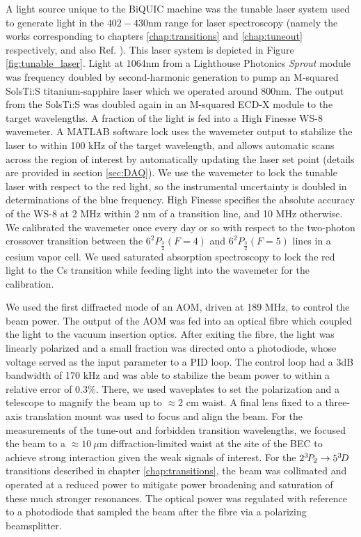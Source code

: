 	A light source unique to the BiQUIC machine was the tunable laser system used to generate light in the $402-430$nm range for laser spectroscopy (namely the works \cite{Ross20,Henson22} corresponding to chapters \ref{chap:transitions} and \ref{chap:tuneout} respectively, and also Ref. \cite{Thomas20}).
	This laser system is depicted in Figure \ref{fig:tunable_laser}.
	Light at 1064nm from a Lighthouse Photonics \emph{Sprout} module was frequency doubled by second-harmonic generation to pump an M-squared SolsTi:S titanium-sapphire laser which we operated around 800nm.
	The output from the SolsTi:S was doubled again in an M-squared ECD-X module to the target wavelengths.
	A fraction of the light is fed into a High Finesse WS-8 wavemeter.
	A MATLAB software lock uses the wavemeter output to stabilize the laser to within 100 kHz of the target wavelength, and allows automatic scans across the region of interest by automatically updating the laser set point (details are provided in section \ref{sec:DAQ}).
	We use the wavemeter to lock the tunable laser with respect to the red light, so the instrumental uncertainty is doubled in determinations of the blue frequency.
	High Finesse specifies the absolute accuracy of the WS-8 at 2 MHz within 2 nm of a transition line, and 10 MHz otherwise.
	We calibrated the wavemeter once every day or so with respect to the two-photon crossover transition between the $6^2P_{\frac{3}{2}} (F=4)$ and $6^2P_{\frac{3}{2}} (F=5)$ lines in a cesium vapor cell.
	We used saturated absorption spectroscopy to lock the red light to the Cs transition while feeding light into the wavemeter for the calibration.	
	

	We used the first diffracted mode of an AOM, driven at 189 MHz, to control the beam power.
	The output of the AOM was fed into an optical fibre which coupled the light to the vacuum insertion optics.
	{After exiting the fibre, the light was linearly polarized and a small fraction was directed onto a photodiode, whose voltage served as the input parameter to a PID loop.
	The control loop had a 3dB bandwidth of 170 kHz and was able to stabilize the beam power to within a relative error of 0.3\%.}
	There, we used waveplates to set the polarization and a telescope to magnify the beam up to $\approx$2 cm waist.
	A final lens fixed to a three-axis translation mount was used to focus and align the beam.
	For the measurements of the tune-out and forbidden transition wavelengths, we focused the beam to a $\approx10~\mu$m diffraction-limited waist at the site of the BEC to achieve strong interaction given the weak signals of interest.
	For the $2^{3\!} P_2\rightarrow 5^{3\!} D$ transitions described in chapter \ref{chap:transitions}, the beam was collimated and operated at a reduced power to mitigate power broadening and saturation of these much stronger resonances.
	The optical power was regulated with reference to a photodiode that sampled the beam after the fibre via a polarizing beamsplitter.

